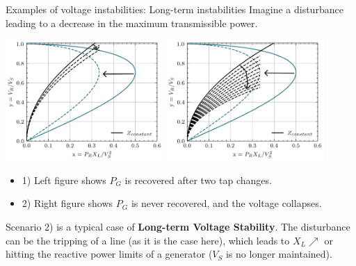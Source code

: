 \begin{frame}[allowframebreaks]{Examples of voltage instabilities: Long-term instabilities}
Imagine a disturbance leading to a decrease in the maximum transmissible power.
\begin{center}
\includegraphics[width=0.45\textwidth]{images/PVcurvestable.png}
\includegraphics[width=0.45\textwidth]{images/PVcurveunstable.png}
\end{center}
\begin{itemize}
    \item 1) Left figure shows $P_G$ is recovered after two tap changes.
    \item 2) Right figure shows $P_G$ is never recovered, and the voltage collapses.
\end{itemize}
Scenario 2) is a typical case of \textbf{Long-term Voltage Stability}.
The disturbance can be the tripping of a line (as it is the case here), which leads to $X_L \nearrow$ or hitting the reactive power limits of a generator ($V_S$ is no longer maintained).
\end{frame}

